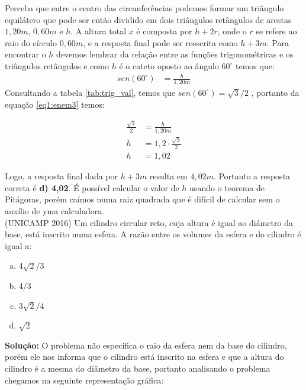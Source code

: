 \begin{multicols*}{2}
    Perceba que entre o centro das circunferências podemos formar um triângulo 
    equilátero que pode ser então dividido em dois triângulos retângulos de arestas 
    $1,20m$, $0,60m$ e $h$. A altura total $x$ é composta por $h + 2r$, onde 
    o $r$ se refere ao raio do círculo $0,60m$, e a resposta final 
    pode ser reescrita como $h+3m$. Para encontrar o $h$ devemos 
    lembrar da relação entre as funções trigonométricas e os triângulos retângulos
    e como $h$ é o cateto oposto ao ângulo $60^\circ$ temos que:
    \begin{align}
        sen(60^\circ) &= \frac{h}{1,20m} \label{eq1:enem3}
    \end{align}
    Consultando a tabela \ref{tab:trig_val}, temos que $sen(60^\circ) = \sqrt{3}/2$
    , portanto da equação \ref{eq1:enem3} temos:  
    
    \begin{align}
        \frac{\sqrt{3}}{2} &= \frac{h}{1,20m}\\
        h &= 1,2\cdot\frac{\sqrt{3}}{2}\\
        h &= 1,02
    \end{align}
    
    Logo, a resposta final dada por $h+3m$ resulta em $4,02m$. Portanto a resposta
    correta é \textbf{d) 4,02}. É possível calcular o valor de $h$ usando o 
    teorema de Pitágoras, porém caímos numa raiz quadrada que é difícil de calcular
    sem o auxílio de yma calculadora.\\
    
    \execnum (UNICAMP 2016) Um cilindro circular reto, cuja altura é igual ao diâmetro da 
    base, está inscrito numa esfera. A razão entre os volumes 
    da esfera e do cilindro é igual a:
    \begin{enumerate}[(a)]
        \item $4\sqrt{2}/3$
        \item $4/3$
        \item $3\sqrt{2}/4$
        \item $\sqrt{2}$
    \end{enumerate}

    \textbf{Solução:} O problema não especifica o raio da esfera nem da base do cilindro, porém 
    ele nos informa que o cilindro está inscrito na esfera e que a altura do cilindro é 
    a mesma do diâmetro da base, portanto analisando o problema chegamos na seguinte representação gráfica:


\end{multicols*}
